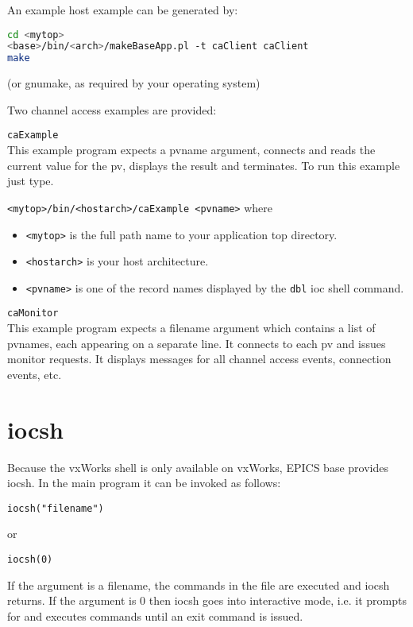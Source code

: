 An example host example can be generated by:

\begin{lstlisting}[language=sh]
cd <mytop>
<base>/bin/<arch>/makeBaseApp.pl -t caClient caClient
make
\end{lstlisting}
(or gnumake, as required by your operating system)

Two channel access examples are provided:

\begin{description}
\item \verb|caExample| \\
This example program expects a pvname argument, connects and reads the current value for the pv, displays the result 
and terminates. To run this example just type.

\verb|<mytop>/bin/<hostarch>/caExample <pvname>|  where

\begin{itemize}
\item \verb|<mytop>| is the full path name to your application top directory.

\item \verb|<hostarch>| is your host architecture.

\item \verb|<pvname>| is one of the record names displayed by the \verb|dbl| ioc shell command.
\end{itemize}

\item \verb|caMonitor| \\
This example program expects a filename argument which contains a list of pvnames, each appearing on a separate line.
It connects to each pv and issues monitor requests.
It displays messages for all channel access events, connection events, etc.
\end{description}

\section{iocsh}

Because the vxWorks shell is only available on vxWorks, EPICS base provides iocsh.
In the main program it can be invoked as follows:

\begin{verbatim}
iocsh("filename")
\end{verbatim}
or
\begin{verbatim}
iocsh(0)
\end{verbatim}
If the argument is a filename, the commands in the file are executed and iocsh returns.
If the argument is 0 then iocsh goes into interactive mode, i.e. it prompts for and executes commands until an exit command is issued.

